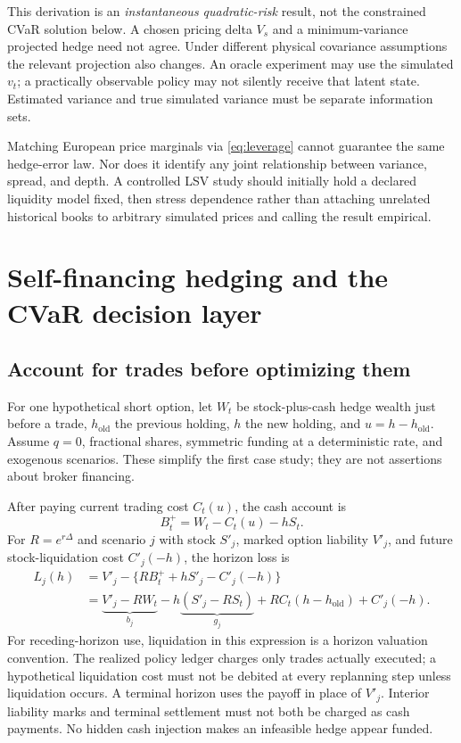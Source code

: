 This derivation is an \emph{instantaneous quadratic-risk} result, not the constrained CVaR solution below. A chosen pricing delta $V_s$ and a minimum-variance projected hedge need not agree. Under different physical covariance assumptions the relevant projection also changes. An oracle experiment may use the simulated $v_t$; a practically observable policy may not silently receive that latent state. Estimated variance and true simulated variance must be separate information sets.

Matching European price marginals via \eqref{eq:leverage} cannot guarantee the same hedge-error law. Nor does it identify any joint relationship between variance, spread, and depth. A controlled LSV study should initially hold a declared liquidity model fixed, then stress dependence rather than attaching unrelated historical books to arbitrary simulated prices and calling the result empirical.

\section{Self-financing hedging and the CVaR decision layer}
\subsection{Account for trades before optimizing them}
For one hypothetical short option, let $W_t$ be stock-plus-cash hedge wealth just before a trade, $h_{\mathrm{old}}$ the previous holding, $h$ the new holding, and $u=h-h_{\mathrm{old}}$. Assume $q=0$, fractional shares, symmetric funding at a deterministic rate, and exogenous scenarios. These simplify the first case study; they are not assertions about broker financing.

After paying current trading cost $C_t(u)$, the cash account is
\[
 B_t^+=W_t-C_t(u)-hS_t.
\]
For $R=e^{r\Delta}$ and scenario $j$ with stock $S'_j$, marked option liability $V'_j$, and future stock-liquidation cost $C'_j(-h)$, the horizon loss is
\begin{align}
 L_j(h)&=V'_j-\{R B_t^+ +hS'_j-C'_j(-h)\}\nonumber\\
       &=\underbrace{V'_j-RW_t}_{b_j}
          -h\underbrace{(S'_j-RS_t)}_{g_j}
          +R C_t(h-h_{\mathrm{old}})+C'_j(-h).\label{eq:loss}
\end{align}
For receding-horizon use, liquidation in this expression is a horizon valuation convention. The realized policy ledger charges only trades actually executed; a hypothetical liquidation cost must not be debited at every replanning step unless liquidation occurs. A terminal horizon uses the payoff in place of $V'_j$. Interior liability marks and terminal settlement must not both be charged as cash payments. No hidden cash injection makes an infeasible hedge appear funded.

